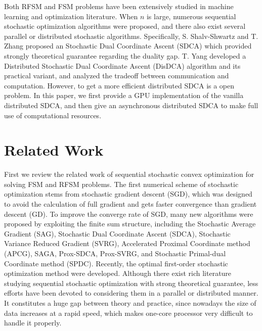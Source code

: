 \documentclass{article}
\begin{document}
Both RFSM and FSM problems have been extensively studied in machine learning and optimization literature. When $n$ is large, numerous sequential stochastic optimization algorithms were proposed\cite{bottou2010large,roux2012stochastic,nemirovski2009robust,shalev2013stochastic,shalev2013accelerated,johnson2013accelerating,ouyang2013stochastic, suzuki2013dual,shalev2014accelerated,xiao2014proximal,defazio2014saga,zhang2015stochastic,lin2014accelerated,defazio2016simple,allen2016katyusha,lan2015optimal}, and there also exist several parallel or distributed stochastic algorithms\cite{boyd2011distributed,recht2011hogwild,zinkevich2010parallelized,yang2013trading,zhang2014asynchronous}. Specifically, S. Shalv-Shwartz and T. Zhang \cite{shalev2013stochastic} proposed an Stochastic Dual Coordinate Ascent (SDCA) which provided strongly theoretical guarantee regarding the duality gap. T. Yang \cite{yang2013trading} developed a Distributed Stochastic Dual Coordinate Ascent (DisDCA) algorithm and its practical variant, and analyzed the tradeoff between communication and computation. However, to get a more efficient distributed SDCA is a open problem. In this paper, we first provide a GPU implementation of the vanilla distributed SDCA\cite{yang2013trading}, and then give an asynchronous distributed SDCA to make full use of computational resources. 
\section{Related Work}
\label{gen_inst}
First we review the related work of sequential stochastic convex optimization for solving FSM and RFSM problems. The first numerical scheme of stochastic optimization stems from stochastic gradient descent (SGD)\cite{bottou2010large,nemirovski2009robust}, which was designed to avoid the calculation of full gradient and gets faster convergence than gradient descent (GD). To improve the converge rate of SGD, many new algorithms were proposed by exploiting the finite sum structure, including the Stochastic Average Gradient (SAG)\cite{roux2012stochastic}, Stochastic Dual Coordinate Ascent (SDCA)\cite{shalev2013stochastic}, Stochastic Variance Reduced Gradient (SVRG)\cite{johnson2013accelerating}, Accelerated Proximal Coordinate method (APCG)\cite{lin2014accelerated},  SAGA\cite{Defazio2014}, Prox-SDCA\cite{shalev2014accelerated}, Prox-SVRG\cite{xiao2014proximal}, and Stochastic Primal-dual Coordinate method (SPDC)\cite{zhang2015stochastic}. Recently, the optimal first-order stochastic optimization method were developed\cite{allen2016katyusha,lan2015optimal}. Although there exist rich literature studying sequential stochastic optimization with strong theoretical guarantee, less efforts have been devoted to considering them in a parallel or distributed manner. It constitutes a huge gap between theory and practice, since nowadays the size of data increases at a rapid speed, which makes one-core processor very difficult to handle it properly.
\end{document}
